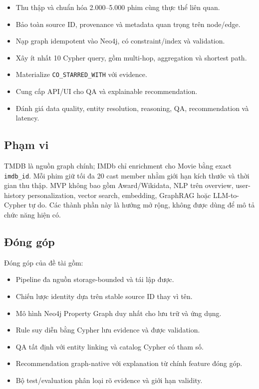 \begin{itemize}
\item Thu thập và chuẩn hóa 2.000–5.000 phim cùng thực thể liên quan.
\item Bảo toàn source ID, provenance và metadata quan trọng trên node/edge.
\item Nạp graph idempotent vào Neo4j, có constraint/index và validation.
\item Xây ít nhất 10 Cypher query, gồm multi-hop, aggregation và shortest path.
\item Materialize \texttt{CO\_STARRED\_WITH} với evidence.
\item Cung cấp API/UI cho QA và explainable recommendation.
\item Đánh giá data quality, entity resolution, reasoning, QA, recommendation và latency.
\end{itemize}

\subsection{Phạm vi}

TMDB là nguồn graph chính; IMDb chỉ enrichment cho Movie bằng exact \texttt{imdb\_id}.
Mỗi phim giữ tối đa 20 cast member nhằm giới hạn kích thước và thời gian thu thập.
MVP không bao gồm Award/Wikidata, NLP trên overview, user-history personalization,
vector search, embedding, GraphRAG hoặc LLM-to-Cypher tự do. Các thành phần này là
hướng mở rộng, không được dùng để mô tả chức năng hiện có.

\subsection{Đóng góp}

Đóng góp của đề tài gồm:

\begin{itemize}
\item Pipeline đa nguồn storage-bounded và tái lập được.
\item Chiến lược identity dựa trên stable source ID thay vì tên.
\item Mô hình Neo4j Property Graph duy nhất cho lưu trữ và ứng dụng.
\item Rule suy diễn bằng Cypher lưu evidence và được validation.
\item QA tất định với entity linking và catalog Cypher có tham số.
\item Recommendation graph-native với explanation từ chính feature đóng góp.
\item Bộ test/evaluation phân loại rõ evidence và giới hạn validity.
\end{itemize}


